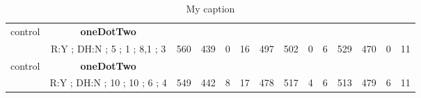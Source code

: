 \begin{table}[]
{\begin{tabular}{|c|c|c|c|c|c|c|c|c|c|c|c|c|c|}
control & \cellcolor{blue!15}\textbf{oneDotTwo}& {\color[HTML]{00009B} } & {\color[HTML]{9A0000} } & {\color[HTML]{009901} } &  & {\color[HTML]{00009B} } & {\color[HTML]{9A0000} } & {\color[HTML]{009901} } &  & {\color[HTML]{00009B} } & {\color[HTML]{9A0000} } & {\color[HTML]{009901} } &  \\ 
 & \cellcolor{ blue!15}R:Y ; DH:N ; 5 ; 1 ; 8,1 ; 3 & \multirow{-2}{*}{{\color[HTML]{00009B} 560}} & \multirow{-2}{*}{{\color[HTML]{9A0000} 439}} & \multirow{-2}{*}{{\color[HTML]{009901} 0}} & \multirow{-2}{*}{16} & \multirow{-2}{*}{{\color[HTML]{00009B} 497}} & \multirow{-2}{*}{{\color[HTML]{9A0000} 502}} & \multirow{-2}{*}{{\color[HTML]{009901} 0}} & \multirow{-2}{*}{6} & \multirow{-2}{*}{{\color[HTML]{00009B} 529}} & \multirow{-2}{*}{{\color[HTML]{9A0000} 470}} & \multirow{-2}{*}{{\color[HTML]{009901} 0}} & \multirow{-2}{*}{11} \\ \hline

control & \cellcolor{blue!15}\textbf{oneDotTwo}& {\color[HTML]{00009B} } & {\color[HTML]{9A0000} } & {\color[HTML]{009901} } &  & {\color[HTML]{00009B} } & {\color[HTML]{9A0000} } & {\color[HTML]{009901} } &  & {\color[HTML]{00009B} } & {\color[HTML]{9A0000} } & {\color[HTML]{009901} } &  \\ 
 & \cellcolor{ blue!15}R:Y ; DH:N ; 10 ; 10 ; 6 ; 4 & \multirow{-2}{*}{{\color[HTML]{00009B} 549}} & \multirow{-2}{*}{{\color[HTML]{9A0000} 442}} & \multirow{-2}{*}{{\color[HTML]{009901} 8}} & \multirow{-2}{*}{17} & \multirow{-2}{*}{{\color[HTML]{00009B} 478}} & \multirow{-2}{*}{{\color[HTML]{9A0000} 517}} & \multirow{-2}{*}{{\color[HTML]{009901} 4}} & \multirow{-2}{*}{6} & \multirow{-2}{*}{{\color[HTML]{00009B} 513}} & \multirow{-2}{*}{{\color[HTML]{9A0000} 479}} & \multirow{-2}{*}{{\color[HTML]{009901} 6}} & \multirow{-2}{*}{11} \\ \hline
\end{tabular}} \caption{ My caption} \label{ my - label} \end{table}
